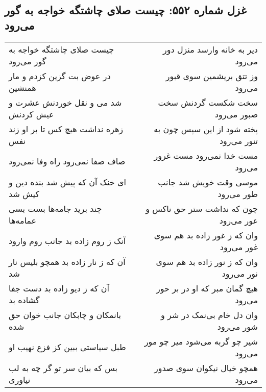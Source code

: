 \begin{center}
\section*{غزل شماره ۵۵۲: چیست صلای چاشتگه خواجه به گور می‌رود}
\label{sec:0552}
\begin{longtable}{l p{0.5cm} r}
چیست صلای چاشتگه خواجه به گور می‌رود
&&
دیر به خانه وارسد منزل دور می‌رود
\\
در عوض بت گزین کزدم و مار همنشین
&&
وز تتق بریشمین سوی قبور می‌رود
\\
شد می و نقل خوردنش عشرت و عیش کردنش
&&
سخت شکست گردنش سخت صبور می‌رود
\\
زهره نداشت هیچ کس تا بر او زند نفس
&&
پخته شود از این سپس چون به تنور می‌رود
\\
صاف صفا نمی‌رود راه وفا نمی‌رود
&&
مست خدا نمی‌رود مست غرور می‌رود
\\
ای خنک آن که پیش شد بنده دین و کیش شد
&&
موسی وقت خویش شد جانب طور می‌رود
\\
چند برید جامه‌ها بست بسی عمامه‌ها
&&
چون که نداشت ستر حق ناکس و عور می‌رود
\\
آنک ز روم زاده بد جانب روم وارود
&&
وان که ز غور زاده بد هم سوی غور می‌رود
\\
آن که ز نار زاده بد همچو بلیس نار شد
&&
وان که ز نور زاده بد هم سوی نور می‌رود
\\
آن که ز دیو زاده بد دست جفا گشاده بد
&&
هیچ گمان مبر که او در بر حور می‌رود
\\
بانمکان و چابکان جانب خوان حق شده
&&
وان دل خام بی‌نمک در شر و شور می‌رود
\\
طبل سیاستی ببین کز فزع نهیب او
&&
شیر چو گربه می‌شود میر چو مور می‌رود
\\
بس که بیان سر تو گر چه به لب نیاوری
&&
همچو خیال نیکوان سوی صدور می‌رود
\\
\end{longtable}
\end{center}

